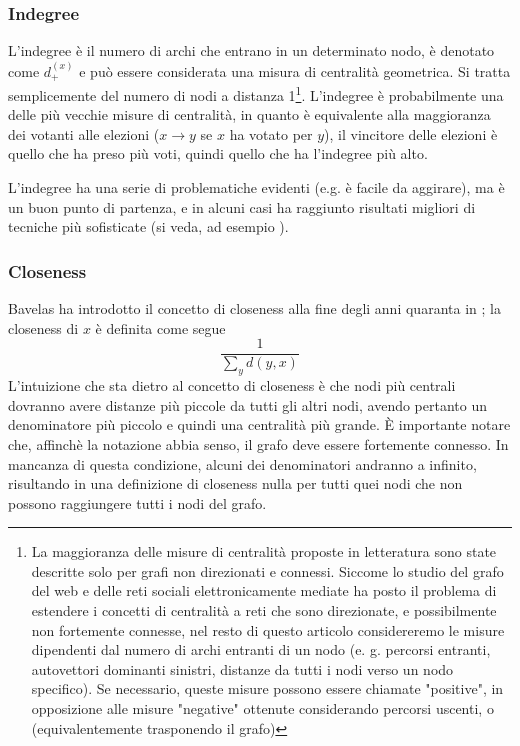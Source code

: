 \subsubsection{Indegree}
L'indegree è il numero di archi che entrano in un determinato nodo, è denotato come $d_+^{(x)}$ e può essere considerata una misura di centralità geometrica. Si tratta semplicemente del numero di nodi a distanza 1\footnote{La maggioranza delle misure di centralità proposte in letteratura sono state descritte solo per grafi non direzionati e connessi. Siccome lo studio del grafo del web e delle reti sociali elettronicamente mediate ha posto il problema di estendere i concetti di centralità a reti che sono direzionate, e possibilmente non fortemente connesse, nel resto di questo articolo considereremo le misure dipendenti dal numero di archi entranti di un nodo (e. g. percorsi entranti, autovettori dominanti sinistri, distanze da tutti i nodi verso un nodo specifico). Se necessario, queste misure possono essere chiamate "positive", in opposizione alle misure "negative" ottenute considerando percorsi uscenti, o (equivalentemente trasponendo il grafo)}. L'indegree è probabilmente una delle più vecchie misure di centralità, in quanto è equivalente alla maggioranza dei votanti alle elezioni ($x \rightarrow y$ se $x$ ha votato per $y$), il vincitore delle elezioni è quello che ha preso più voti, quindi quello che ha l'indegree più alto.

L'indegree ha una serie di problematiche evidenti (e.g. è facile da aggirare), ma è un buon punto di partenza, e in alcuni casi ha raggiunto risultati migliori di tecniche più sofisticate (si veda, ad esempio \cite{degree}).
\subsubsection{Closeness}
Bavelas ha introdotto il concetto di closeness alla fine degli anni quaranta in \cite{bavelas}; la closeness di $x$ è definita come segue
\begin{equation}
    \frac{1}{\sum_y{d(y, x)}}
\end{equation}
L'intuizione che sta dietro al concetto di closeness è che nodi più centrali dovranno avere distanze più piccole da tutti gli altri nodi, avendo pertanto un denominatore più piccolo e quindi una centralità più grande. È importante notare che, affinchè la notazione abbia senso, il grafo deve essere fortemente connesso. In mancanza di questa condizione, alcuni dei denominatori andranno a infinito, risultando in una definizione di closeness nulla per tutti quei nodi che non possono raggiungere tutti i nodi del grafo.

